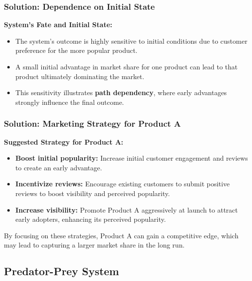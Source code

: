 \documentclass{beamer}
\begin{document}
\begin{frame}
    \frametitle{Solution: Dependence on Initial State}

    \textbf{System's Fate and Initial State:}
    \begin{itemize}
        \item The system's outcome is highly sensitive to initial conditions due to customer preference for the more popular product.
        \item A small initial advantage in market share for one product can lead to that product ultimately dominating the market.
        \item This sensitivity illustrates \textbf{path dependency}, where early advantages strongly influence the final outcome.
    \end{itemize}
\end{frame}

\begin{frame}
    \frametitle{Solution: Marketing Strategy for Product A}

    \textbf{Suggested Strategy for Product A:}
    \begin{itemize}
        \item \textbf{Boost initial popularity:} Increase initial customer engagement and reviews to create an early advantage.
        \item \textbf{Incentivize reviews:} Encourage existing customers to submit positive reviews to boost visibility and perceived popularity.
        \item \textbf{Increase visibility:} Promote Product A aggressively at launch to attract early adopters, enhancing its perceived popularity.
    \end{itemize}

    By focusing on these strategies, Product A can gain a competitive edge, which may lead to capturing a larger market share in the long run.
\end{frame}

\subsection{Predator-Prey System}
\end{document}

